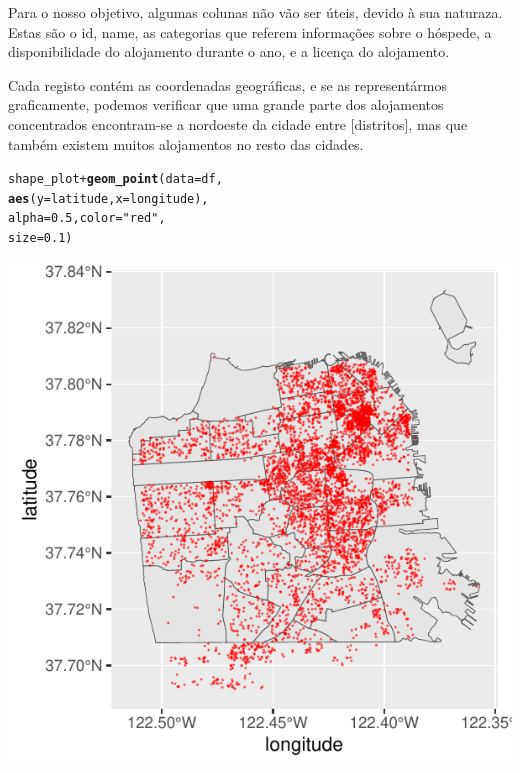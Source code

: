 \documentclass[a4paper, justified]{tufte-handout}\usepackage[]{graphicx}\usepackage[]{xcolor}
\makeatletter
\def\maxwidth{ %
  \ifdim\Gin@nat@width>\linewidth
    \linewidth
  \else
    \Gin@nat@width
  \fi
}
\newcommand{\hlnum}[1]{\textcolor[rgb]{0.686,0.059,0.569}{#1}}%
\newcommand{\hlstr}[1]{\textcolor[rgb]{0.192,0.494,0.8}{#1}}%
\newcommand{\hlopt}[1]{\textcolor[rgb]{0,0,0}{#1}}%
\newcommand{\hlstd}[1]{\textcolor[rgb]{0.345,0.345,0.345}{#1}}%
\newcommand{\hlkwc}[1]{\textcolor[rgb]{0.333,0.667,0.333}{#1}}%
\newcommand{\hlkwd}[1]{\textcolor[rgb]{0.737,0.353,0.396}{\textbf{#1}}}%
\newenvironment{kframe}{%
 \def\at@end@of@kframe{}%
 \ifinner\ifhmode%
  \def\at@end@of@kframe{\end{minipage}}%
  \begin{minipage}{\columnwidth}%
 \fi\fi%
 \def\FrameCommand##1{\hskip\@totalleftmargin \hskip-\fboxsep
 \colorbox{shadecolor}{##1}\hskip-\fboxsep
     \hskip-\linewidth \hskip-\@totalleftmargin \hskip\columnwidth}%
 \MakeFramed {\advance\hsize-\width
   \@totalleftmargin\z@ \linewidth\hsize
   \@setminipage}}%
 {\par\unskip\endMakeFramed%
 \at@end@of@kframe}
\newenvironment{knitrout}{}{} %
\makeatother
\begin{document}
Para o nosso objetivo, algumas colunas não vão ser úteis, devido à sua naturaza. Estas são o id, name, as categorias que referem informações sobre o hóspede, a disponibilidade do alojamento durante o ano, e a licença do alojamento. 

Cada registo contém as coordenadas geográficas, e se as representármos graficamente, podemos verificar que uma grande parte dos alojamentos concentrados encontram-se a nordoeste da cidade entre [distritos], mas que também existem muitos alojamentos no resto das cidades.  %
\begin{knitrout}
\color{fgcolor}\begin{kframe}
\begin{alltt}
\hlstd{shape_plot} \hlopt{+} \hlkwd{geom_point}\hlstd{(}\hlkwc{data} \hlstd{= df,}
    \hlkwd{aes}\hlstd{(}\hlkwc{y} \hlstd{= latitude,} \hlkwc{x} \hlstd{= longitude),}
    \hlkwc{alpha} \hlstd{=} \hlnum{0.5}\hlstd{,} \hlkwc{color} \hlstd{=} \hlstr{"red"}\hlstd{,}
    \hlkwc{size} \hlstd{=} \hlnum{0.1}\hlstd{)}
\end{alltt}
\end{kframe}\begin{marginfigure}
\includegraphics[width=\maxwidth]{figure/chunk-plotPlace-1} \end{marginfigure}

\end{knitrout}
\end{document}
